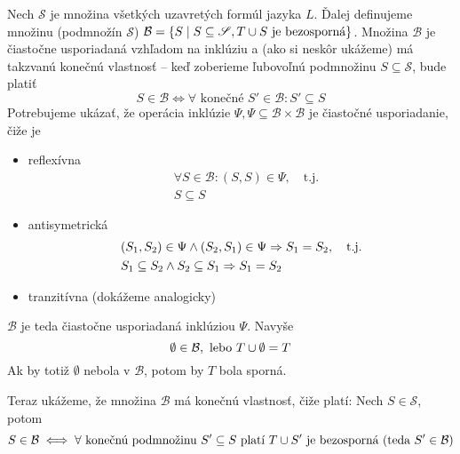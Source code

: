 \begin{dokaz}
    Nech $\mathscr{S}$ je množina všetkých uzavretých formúl jazyka $L$.
    Ďalej definujeme množinu (podmnožín $\mathscr{S}$)
    $\mathcal{B} = \{ S \mid S \subseteq \mathscr{S}, T \cup S
        \mbox{ je bezosporná}\}$.
    Množina $\mathcal{B}$ je čiastočne usporiadaná vzhľadom na
    inklúziu a (ako si neskôr ukážeme) má 
    takzvanú konečnú vlastnosť -- keď zoberieme ľubovoľnú podmnožinu
    $S \subseteq \mathscr{S}$, bude platiť
    \begin{equation*}
        S \in \mathcal{B} \iff \forall \mbox{ konečné } S' \in
        \mathcal{B}: S' \subseteq S
    \end{equation*}
     Potrebujeme ukázať, že operácia inklúzie $\Psi, \Psi \subseteq
     \mathcal{B}\times\mathcal{B}$ je čiastočné usporiadanie, čiže je
    \begin{itemize}
        \item reflexívna
            \begin{align*}
                &\forall S \in \mathcal{B}: (S,S) \in \Psi,
                \quad \mbox{t.j.} \\
                &S \subseteq S
            \end{align*}
        \item antisymetrická
            \begin{align*}
                &(S_1,S_2) \in \Psi \land (S_2,S_1) \in \Psi
                    \Rightarrow S_1 = S_2, \quad \mbox{t.j.} \\
                &S_1 \subseteq S_2 \land S_2 \subseteq S_1 \Rightarrow S_1 = S_2
            \end{align*}
        \item tranzitívna (dokážeme analogicky)
    \end{itemize}
    $\mathcal{B}$ je teda čiastočne usporiadaná inklúziou $\Psi$.
    Navyše
    \begin{equation*}
        \emptyset \in \mathcal{B}, \mbox{ lebo } T \cup \emptyset = T
    \end{equation*}
    Ak by totiž $\emptyset$ nebola v $\mathcal{B}$, potom by $T$ bola sporná.

    \noindent
    Teraz ukážeme, že množina $\mathcal{B}$ má konečnú vlastnosť, čiže
    platí: Nech $S \in \mathscr{S}$, potom
    \begin{equation*}
            S \in \mathcal{B} \iff \forall \textrm{
        konečnú podmnožinu }S' \subseteq S \textrm{ platí } T \cup S' 
            \textrm{ je bezosporná (teda }S' \in \mathcal{B})
    \end{equation*}
   

\end{dokaz}
